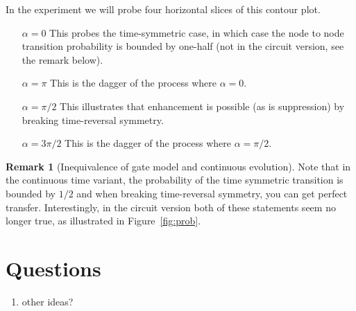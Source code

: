 \documentclass[aps,pra,12pt,nofootinbib,superscriptaddress,longbibliography,showpacs]{revtex4-1}
\theoremstyle{plain}
\theoremstyle{definition}
\newtheorem{remark}[theorem]{Remark}
\begin{document}
% 
% 


In the experiment we will probe four horizontal slices of this contour plot.  

\begin{itemize}
 \item[$\alpha = 0$] This probes the time-symmetric case, in which case the
node to node transition probability is bounded by one-half (not in the circuit
version, see the remark below). 
\item[$\alpha = \pi$] This is the dagger of the process where $\alpha = 0$. 
\item[$\alpha = \pi/2$] This illustrates that enhancement is possible (as is
suppression) by breaking time-reversal symmetry. 
\item[$\alpha = 3\pi/2$] This is the dagger of the process where $\alpha =
\pi/2$. 
\end{itemize}


\begin{remark}[Inequivalence of gate model and continuous evolution] 
Note that in the continuous time variant, the probability of the time symmetric
transition is bounded by $1/2$ and when breaking time-reversal symmetry, you
can get perfect transfer.  Interestingly, in the circuit version both of these
statements seem no longer true, as illustrated in Figure~\ref{fig:prob}. 
\end{remark}



\section{Questions}

\begin{enumerate} 
\item other ideas?   
\end{enumerate} 








\end{document}
